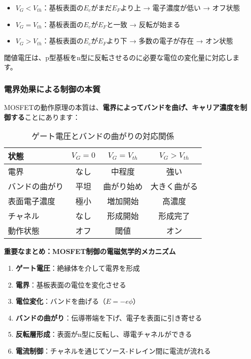 \begin{itemize}
\item $V_G < V_{th}$：基板表面の$E_c$がまだ$E_F$より上 → 電子濃度が低い → オフ状態
\item $V_G = V_{th}$：基板表面の$E_c$が$E_F$と一致 → 反転が始まる
\item $V_G > V_{th}$：基板表面の$E_c$が$E_F$より下 → 多数の電子が存在 → オン状態
\end{itemize}

閾値電圧は、p型基板をn型に反転させるのに必要な電位の変化量に対応します。

\subsubsection{電界効果による制御の本質}

MOSFETの動作原理の本質は、\textbf{電界によってバンドを曲げ、キャリア濃度を制御する}ことにあります：

\begin{table}[H]
\centering
\caption{ゲート電圧とバンドの曲がりの対応関係}
\begin{tabular}{|l|c|c|c|}
\hline
\textbf{状態} & \textbf{$V_G = 0$} & \textbf{$V_G = V_{th}$} & \textbf{$V_G > V_{th}$} \\
\hline
電界 & なし & 中程度 & 強い \\
\hline
バンドの曲がり & 平坦 & 曲がり始め & 大きく曲がる \\
\hline
表面電子濃度 & 極小 & 増加開始 & 高濃度 \\
\hline
チャネル & なし & 形成開始 & 形成完了 \\
\hline
動作状態 & オフ & 閾値 & オン \\
\hline
\end{tabular}
\end{table}

\textbf{重要なまとめ：MOSFET制御の電磁気学的メカニズム}

\begin{enumerate}
\item \textbf{ゲート電圧}：絶縁体を介して電界を形成
\item \textbf{電界}：基板表面の電位を変化させる
\item \textbf{電位変化}：バンドを曲げる（$E = -e\phi$）
\item \textbf{バンドの曲がり}：伝導帯端を下げ、電子を表面に引き寄せる
\item \textbf{反転層形成}：表面がn型に反転し、導電チャネルができる
\item \textbf{電流制御}：チャネルを通じてソース-ドレイン間に電流が流れる
\end{enumerate}


